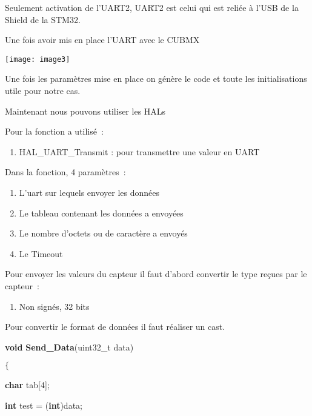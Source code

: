\noindent Seulement activation de l'UART2, UART2 est celui qui est reli\'{e}e \`{a} l'USB de la Shield de la STM32.

\noindent Une fois avoir mis en place l'UART avec le CUBMX

\noindent \texttt{[image: image3]}

\noindent Une fois les param\`{e}tres mise en place on g\'{e}n\`{e}re le code et toute les initialisations utile pour notre cas.

\noindent Maintenant nous pouvons utiliser les HALs 

\noindent 

\noindent 

\noindent Pour la fonction a utilis\'{e}~:

\begin{enumerate}
\item  HAL\_UART\_Transmit : pour transmettre une valeur en UART
\end{enumerate}

\noindent Dans la fonction, 4 param\`{e}tres~:

\begin{enumerate}
\item  L'uart sur lequels envoyer les donn\'{e}es

\item  Le tableau contenant les donn\'{e}es a envoy\'{e}es

\item  Le nombre d'octets ou de caract\`{e}re a envoy\'{e}s

\item  Le Timeout
\end{enumerate}

\noindent 

\noindent Pour envoyer les valeurs du capteur il faut d'abord convertir le type re\c{c}ues par le capteur~: 

\begin{enumerate}
\item  Non sign\'{e}s, 32 bits 
\end{enumerate}

\noindent Pour convertir le format de donn\'{e}es il faut r\'{e}aliser un cast.

\noindent \textbf{void} \textbf{Send\_Data}(uint32\_t data)

\noindent $\mathrm{\{}$

 \textbf{char} tab[4];

 \textbf{int} test = (\textbf{int})data;

